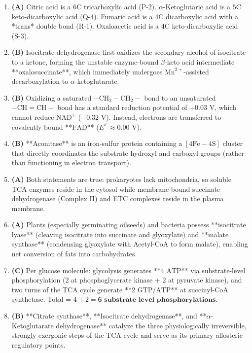 \documentclass[11pt, a4paper]{article}
\begin{document}
\begin{enumerate}[label=\textbf{\arabic*.}]
\item \textbf{(A)} Citric acid is a $6\text{C}$ tricarboxylic acid (P-2). $\alpha$-Ketoglutaric acid is a $5\text{C}$ keto-dicarboxylic acid (Q-4). Fumaric acid is a $4\text{C}$ dicarboxylic acid with a *trans* double bond (R-1). Oxaloacetic acid is a $4\text{C}$ keto-dicarboxylic acid (S-3).

\item \textbf{(B)} Isocitrate dehydrogenase first oxidizes the secondary alcohol of isocitrate to a ketone, forming the unstable enzyme-bound $\beta$-keto acid intermediate **oxalosuccinate**, which immediately undergoes $\text{Mn}^{2+}$-assisted decarboxylation to $\alpha$-ketoglutarate.

\item \textbf{(B)} Oxidizing a saturated $-\text{CH}_2-\text{CH}_2-$ bond to an unsaturated $-\text{CH}=\text{CH}-$ bond has a standard reduction potential of $+0.03\text{ V}$, which cannot reduce $\text{NAD}^+$ ($-0.32\text{ V}$). Instead, electrons are transferred to covalently bound **$\text{FAD}$** ($E^{\circ\prime} \approx 0.00\text{ V}$).

\item \textbf{(B)} **Aconitase** is an iron-sulfur protein containing a $[4\text{Fe}-4\text{S}]$ cluster that directly coordinates the substrate hydroxyl and carboxyl groups (rather than functioning in electron transport).

\item \textbf{(A)} Both statements are true: prokaryotes lack mitochondria, so soluble TCA enzymes reside in the cytosol while membrane-bound succinate dehydrogenase (Complex II) and ETC complexes reside in the plasma membrane.

\item \textbf{(A)} Plants (especially germinating oilseeds) and bacteria possess **isocitrate lyase** (cleaving isocitrate into succinate and glyoxylate) and **malate synthase** (condensing glyoxylate with Acetyl-CoA to form malate), enabling net conversion of fats into carbohydrates.

\item \textbf{(C)} Per glucose molecule: glycolysis generates **$4\text{ ATP}$** via substrate-level phosphorylation ($2$ at phosphoglycerate kinase + $2$ at pyruvate kinase), and two turns of the TCA cycle generate **$2\text{ GTP}/\text{ATP}$** at succinyl-CoA synthetase. Total = $4 + 2 = \mathbf{6\text{ substrate-level phosphorylations}}$.

\item \textbf{(B)} **Citrate synthase**, **Isocitrate dehydrogenase**, and **$\alpha$-Ketoglutarate dehydrogenase** catalyze the three physiologically irreversible, strongly exergonic steps of the TCA cycle and serve as its primary allosteric regulatory points.


\end{enumerate}
\end{document}
